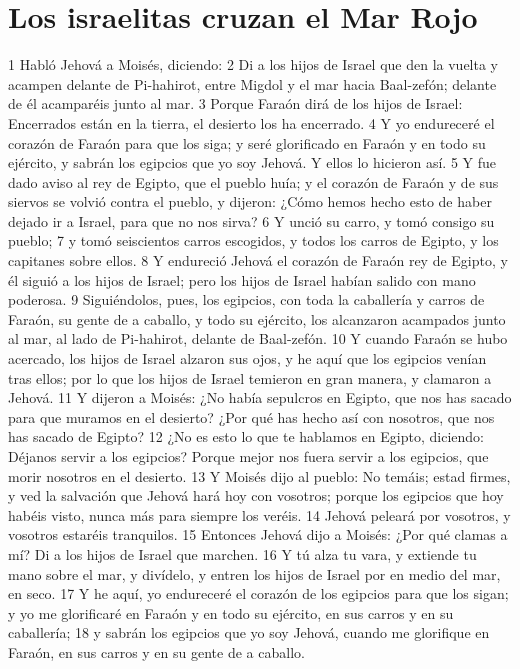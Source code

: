 \section*{Los israelitas cruzan el Mar Rojo}
1 Habló Jehová a Moisés, diciendo:
2 Di a los hijos de Israel que den la vuelta y acampen delante de Pi-hahirot, entre Migdol y el mar hacia Baal-zefón; delante de él acamparéis junto al mar.
3 Porque Faraón dirá de los hijos de Israel: Encerrados están en la tierra, el desierto los ha encerrado.
4 Y yo endureceré el corazón de Faraón para que los siga; y seré glorificado en Faraón y en todo su ejército, y sabrán los egipcios que yo soy Jehová. Y ellos lo hicieron así.
5 Y fue dado aviso al rey de Egipto, que el pueblo huía; y el corazón de Faraón y de sus siervos se volvió contra el pueblo, y dijeron: ¿Cómo hemos hecho esto de haber dejado ir a Israel, para que no nos sirva?
6 Y unció su carro, y tomó consigo su pueblo;
7 y tomó seiscientos carros escogidos, y todos los carros de Egipto, y los capitanes sobre ellos.
8 Y endureció Jehová el corazón de Faraón rey de Egipto, y él siguió a los hijos de Israel; pero los hijos de Israel habían salido con mano poderosa.
9 Siguiéndolos, pues, los egipcios, con toda la caballería y carros de Faraón, su gente de a caballo, y todo su ejército, los alcanzaron acampados junto al mar, al lado de Pi-hahirot, delante de Baal-zefón.
10 Y cuando Faraón se hubo acercado, los hijos de Israel alzaron sus ojos, y he aquí que los egipcios venían tras ellos; por lo que los hijos de Israel temieron en gran manera, y clamaron a Jehová.
11 Y dijeron a Moisés: ¿No había sepulcros en Egipto, que nos has sacado para que muramos en el desierto? ¿Por qué has hecho así con nosotros, que nos has sacado de Egipto?
12 ¿No es esto lo que te hablamos en Egipto, diciendo: Déjanos servir a los egipcios? Porque mejor nos fuera servir a los egipcios, que morir nosotros en el desierto.
13 Y Moisés dijo al pueblo: No temáis; estad firmes, y ved la salvación que Jehová hará hoy con vosotros; porque los egipcios que hoy habéis visto, nunca más para siempre los veréis.
14 Jehová peleará por vosotros, y vosotros estaréis tranquilos.
15 Entonces Jehová dijo a Moisés: ¿Por qué clamas a mí? Di a los hijos de Israel que marchen.
16 Y tú alza tu vara, y extiende tu mano sobre el mar, y divídelo, y entren los hijos de Israel por en medio del mar, en seco.
17 Y he aquí, yo endureceré el corazón de los egipcios para que los sigan; y yo me glorificaré en Faraón y en todo su ejército, en sus carros y en su caballería;
18 y sabrán los egipcios que yo soy Jehová, cuando me glorifique en Faraón, en sus carros y en su gente de a caballo.
